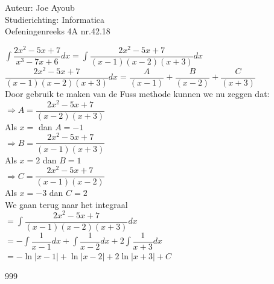 \documentclass[a4paper]{article}
\newcommand{\integraal}{\displaystyle\int}
\begin{document}
  
\noindent \large Auteur: Joe Ayoub \\
\noindent \large Studierichting: Informatica\\
\noindent \large Oefeningenreeks 4A nr.42.18 \\

\medskip

\normalsize

$\integraal{}\dfrac{2x^2 - 5x + 7}{x^3 - 7x + 6}dx = \integraal{}\dfrac{2x^2 - 5x + 7}{(x-1)(x-2)(x+3)}dx$ \\

$ \dfrac{2x^2 - 5x + 7}{(x-1)(x-2)(x+3)}dx = \dfrac{A}{(x-1)} + \dfrac{B}{(x-2)} + \dfrac{C}{(x + 3)}$ \\

Door gebruik te maken van de Fuss methode kunnen we nu zeggen dat: \\

$ \Rightarrow A = \dfrac{2x^2 - 5x + 7}{(x-2)(x+3)}$ \\

Als $x = $ dan $A =  -1$ \\

$ \Rightarrow B = \dfrac{2x^2 - 5x + 7}{(x-1)(x+3)}$\\

Als $x = 2$ dan $B = 1$ \\

$ \Rightarrow C = \dfrac{2x^2 - 5x + 7}{(x-1)(x-2)}$\\

Als $x = -3$ dan $C = 2$ \\

We gaan terug naar het integraal \\

$= \integraal{}\dfrac{2x^2 - 5x + 7}{(x-1)(x-2)(x+3)}dx$ \\

$= -\integraal{}\dfrac{1}{x-1}dx + \integraal{}\dfrac{1}{x-2}dx + 2\integraal{}\dfrac{1}{x+3}dx$ \\

$= -\ln{}|x-1| + \ln{}|x-2| + 2\ln{}|x+3| + C$

\begin{thebibliography}{999}
\end{thebibliography}
\end{document}
